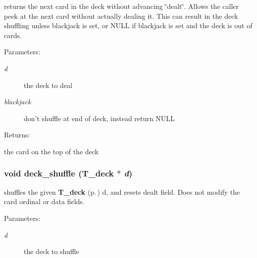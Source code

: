returns the next card in the deck without advancing \char`\"{}dealt\char`\"{}. Allows the caller peek at the next card without actually dealing it. This can result in the deck shuffling unless blackjack is set, or NULL if blackjack is set and the deck is out of cards.

\begin{Desc}
\item[Parameters: ]\par
\begin{description}
\item[{\em 
d}]the deck to deal \item[{\em 
blackjack}]don't shuffle at end of deck, instead return NULL \end{description}
\end{Desc}
\begin{Desc}
\item[Returns: ]\par
the card on the top of the deck \end{Desc}
\subsubsection{\setlength{\rightskip}{0pt plus 5cm}void deck\_\-shuffle ({\bf T\_\-deck} $\ast$ {\em d})}\label{deck_8h_a2}


shuffles the given {\bf T\_\-deck} {\rm (p.\,\pageref{structT__deck})} d, and resets dealt field. Does not modify the card ordinal or data fields.

\begin{Desc}
\item[Parameters: ]\par
\begin{description}
\item[{\em 
d}]the deck to shuffle \end{description}
\end{Desc}
